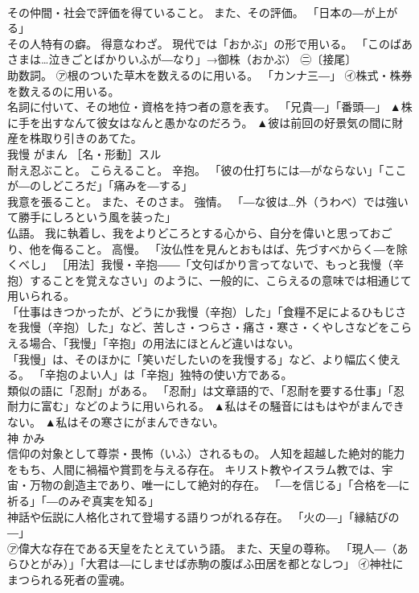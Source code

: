 \documentclass[8pt]{extreport}
\begin{document}
\begin{CJK}{UTF8}{min}
\\	その仲間・社会で評価を得ていること。 また、その評価。 「日本の―が上がる」 
\\	その人特有の癖。 得意なわざ。 現代では「おかぶ」の形で用いる。 「このばあさまは…泣きごとばかりいふが―なり」→御株（おかぶ） ㊁〔接尾〕 
\\	助数詞。 ㋐根のついた草木を数えるのに用いる。 「カンナ三―」 ㋑株式・株券を数えるのに用いる。 
\\	名詞に付いて、その地位・資格を持つ者の意を表す。 「兄貴―」「番頭―」	▲株に手を出すなんて彼女はなんと愚かなのだろう。 ▲彼は前回の好景気の間に財産を株取り引きのあてた。
\\	我慢	がまん	［名・形動］スル 
\\	耐え忍ぶこと。 こらえること。 辛抱。 「彼の仕打ちには―がならない」「ここが―のしどころだ」「痛みを―する」 
\\	我意を張ること。 また、そのさま。 強情。 「―な彼は…外（うわべ）では強いて勝手にしろという風を装った」 
\\	仏語。 我に執着し、我をよりどころとする心から、自分を偉いと思っておごり、他を侮ること。 高慢。 「汝仏性を見んとおもはば、先づすべからく―を除くべし」 ［用法］我慢・辛抱――「文句ばかり言ってないで、もっと我慢（辛抱）することを覚えなさい」のように、一般的に、こらえるの意味では相通じて用いられる。 
\\	「仕事はきつかったが、どうにか我慢（辛抱）した」「食糧不足によるひもじさを我慢（辛抱）した」など、苦しさ・つらさ・痛さ・寒さ・くやしさなどをこらえる場合、「我慢」「辛抱」の用法にほとんど違いはない。 
\\	「我慢」は、そのほかに「笑いだしたいのを我慢する」など、より幅広く使える。 「辛抱のよい人」は「辛抱」独特の使い方である。 
\\	類似の語に「忍耐」がある。 「忍耐」は文章語的で、「忍耐を要する仕事」「忍耐力に富む」などのように用いられる。	▲私はその騒音にはもはやがまんできない。 ▲私はその寒さにがまんできない。
\\	神	かみ	
\\	信仰の対象として尊崇・畏怖（いふ）されるもの。 人知を超越した絶対的能力をもち、人間に禍福や賞罰を与える存在。 キリスト教やイスラム教では、宇宙・万物の創造主であり、唯一にして絶対的存在。 「―を信じる」「合格を―に祈る」「―のみぞ真実を知る」 
\\	神話や伝説に人格化されて登場する語りつがれる存在。 「火の―」「縁結びの―」 
\\	㋐偉大な存在である天皇をたとえていう語。 また、天皇の尊称。 「現人―（あらひとがみ）」「大君は―にしませば赤駒の腹ばふ田居を都となしつ」 ㋑神社にまつられる死者の霊魂。 

\end{CJK}
\end{document}
